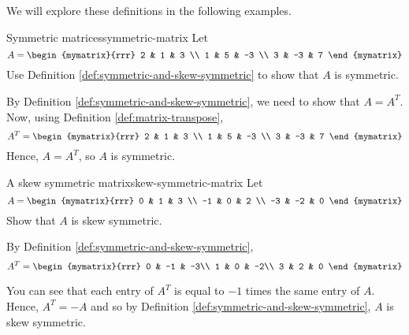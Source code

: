 We will explore these definitions in the following examples.

\begin{example}{Symmetric matrices}{symmetric-matrix}
Let
\begin{equation*}
A=\begin{mymatrix}{rrr}
2 & 1 & 3 \\
1 & 5 & -3 \\
3 & -3 & 7
\end{mymatrix} 
\end{equation*}
Use Definition \ref{def:symmetric-and-skew-symmetric} to show that $A$ is symmetric. 
\end{example}

\begin{solution}
By Definition \ref{def:symmetric-and-skew-symmetric}, we need to show that $A = A^T$. 
Now, using Definition \ref{def:matrix-transpose}, 
\begin{equation*}
A^{T} = \begin{mymatrix}{rrr}
2 & 1 & 3 \\
1 & 5 & -3 \\
3 & -3 & 7
\end{mymatrix}
\end{equation*}
Hence, $A = A^{T}$, so $A$ is symmetric.
\end{solution}

\begin{example}{A skew symmetric matrix}{skew-symmetric-matrix}
Let
\begin{equation*}
A=\begin{mymatrix}{rrr}
0 & 1 & 3 \\
-1 & 0 & 2 \\
-3 & -2 & 0
\end{mymatrix} 
\end{equation*}
Show that $A$ is skew symmetric.
\end{example}

\begin{solution} By Definition \ref{def:symmetric-and-skew-symmetric}, 
\begin{equation*}
A^{T} = \begin{mymatrix}{rrr}
0 & -1 & -3\\
1 &  0 & -2\\
3 &  2 &  0
\end{mymatrix} 
\end{equation*}

You can see that each entry of $A^T$ is equal to $-1$ times the same entry of $A$. 
Hence, $A^{T} = - A$ and so by Definition \ref{def:symmetric-and-skew-symmetric}, $A$ is skew symmetric. 
\end{solution}
